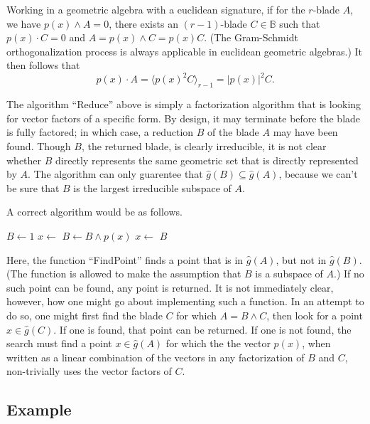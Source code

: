 \documentclass{birkjour}
\theoremstyle{definition}
\theoremstyle{remark}
\numberwithin{equation}{section}
\newcommand{\B}{\mathbb{B}}
\newcommand{\gh}{\hat{g}}
\begin{document}
Working in a geometric algebra with a euclidean signature, if for the $r$-blade $A$, we have $p(x)\wedge A=0$,
there exists an $(r-1)$-blade $C\in\B$ such that $p(x)\cdot C=0$ and $A=p(x)\wedge C=p(x)C$.  (The
Gram-Schmidt orthogonalization process is always applicable in euclidean geometric algebras.)
It then follows that
\begin{equation}
p(x)\cdot A = \langle p(x)^2 C\rangle_{r-1}=|p(x)|^2 C.
\end{equation}

The algorithm ``Reduce'' above is simply a factorization algorithm that is looking for
vector factors of a specific form.  By design, it may terminate before the blade is fully factored;
in which case, a reduction $B$ of the blade $A$ may have been found.  Though $B$, the returned blade,
is clearly irreducible, it is not clear whether $B$ directly represents the same geometric set that is
directly represented by $A$.  The algorithm can only guarentee
that $\gh(B)\subseteq\gh(A)$, because we can't be sure that $B$ is the largest irreducible subspace of $A$.

A correct algorithm would be as follows.

\begin{algorithmic}
	\State $B\gets 1$
	\State $x\gets$
		\State $B\gets B\wedge p(x)$
		\State $x\gets$
	\EndWhile
	\State\Return $B$
\EndFunction
\end{algorithmic}
Here, the function ``FindPoint'' finds a point that is in $\gh(A)$, but not in $\gh(B)$.  (The function is allowed to make the assumption that
$B$ is a subspace of $A$.)  If no such point can be
found, any point is returned.  It is not immediately clear, however, how one might go about implementing such a function.
In an attempt to do so, one might first find the blade $C$ for which $A=B\wedge C$, then look for a point $x\in\gh(C)$.
If one is found, that point can be returned.  If one is not found, the search must find a point $x\in\gh(A)$ for which the
the vector $p(x)$, when written as a linear combination of the vectors in any factorization of $B$ and $C$, non-trivially uses
the vector factors of $C$.

\subsection{Example}
\end{document}
